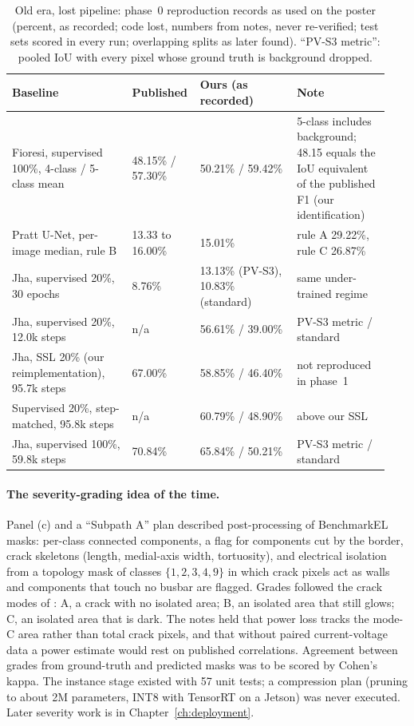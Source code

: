 \begin{table}[htbp]
\centering
\footnotesize
\setlength{\tabcolsep}{4pt}
\caption{Old era, lost pipeline: phase~0 reproduction records as used on the poster (percent, as recorded; code lost, numbers from
notes, never re-verified; test sets scored in every run; overlapping splits as later found). ``PV-S3 metric'': pooled IoU with every
pixel whose ground truth is background dropped.}
\label{tab:repro-poster}
\begin{tabular}{@{}p{0.31\linewidth}p{0.14\linewidth}p{0.25\linewidth}p{0.24\linewidth}@{}}
\toprule
Baseline & Published & Ours (as recorded) & Note \\
\midrule
Fioresi, supervised 100\%, 4-class / 5-class mean & 48.15\% / 57.30\% & 50.21\% / 59.42\% & 5-class includes background; 48.15 equals the IoU equivalent of the published F1 (our identification) \\
Pratt U-Net, per-image median, rule B & 13.33 to 16.00\% & 15.01\% & rule A 29.22\%, rule C 26.87\% \\
Jha, supervised 20\%, 30 epochs & 8.76\% & 13.13\% (PV-S3), 10.83\% (standard) & same under-trained regime \\
Jha, supervised 20\%, 12.0k steps & n/a & 56.61\% / 39.00\% & PV-S3 metric / standard \\
Jha, SSL 20\% (our reimplementation), 95.7k steps & 67.00\% & 58.85\% / 46.40\% & not reproduced in phase~1 \\
Supervised 20\%, step-matched, 95.8k steps & n/a & 60.79\% / 48.90\% & above our SSL \\
Jha, supervised 100\%, 59.8k steps & 70.84\% & 65.84\% / 50.21\% & PV-S3 metric / standard \\
\bottomrule
\end{tabular}
\end{table}

\paragraph{The severity-grading idea of the time.} Panel (c) and a ``Subpath A'' plan described post-processing of BenchmarkEL masks:
per-class connected components, a flag for components cut by the border, crack skeletons (length, medial-axis width, tortuosity), and
electrical isolation from a topology mask of classes $\{1,2,3,4,9\}$ in which crack pixels act as walls and components that touch no
busbar are flagged. Grades followed the crack modes of \citet{kontges2011risk}: A, a crack with no isolated area; B, an isolated area
that still glows; C, an isolated area that is dark. The notes held that power loss tracks the mode-C area rather than total crack
pixels, and that without paired current-voltage data a power estimate would rest on published correlations. Agreement between grades
from ground-truth and predicted masks was to be scored by Cohen's kappa. The instance stage existed with 57 unit tests; a compression
plan (pruning to about 2M parameters, INT8 with TensorRT on a Jetson) was never executed. Later severity work is in
Chapter~\ref{ch:deployment}.

